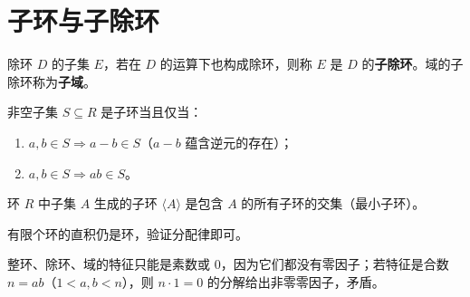 \section{子环与子除环}

\begin{definition}[子除环]
除环 $D$ 的子集 $E$，若在 $D$ 的运算下也构成除环，则称 $E$ 是 $D$ 的\textbf{子除环}。域的子除环称为\textbf{子域}。
\end{definition}

\begin{lemma}[子环的等价条件（引理 2.1）]
非空子集 $S \subseteq R$ 是子环当且仅当：
\begin{enumerate}
  \item $a, b \in S \Rightarrow a - b \in S$（$a-b$ 蕴含逆元的存在）；
  \item $a, b \in S \Rightarrow ab \in S$。
\end{enumerate}
\end{lemma}

\begin{definition}[子集生成的环（定义 2.7）]
环 $R$ 中子集 $A$ 生成的子环 $\langle A \rangle$ 是包含 $A$ 的所有子环的交集（最小子环）。
\end{definition}

\begin{theorem}[定理 2：环的直积还是环（命题 2.5）]
有限个环的直积仍是环，验证分配律即可。
\end{theorem}

\begin{proposition}[整环中素数阶]
整环、除环、域的特征只能是素数或 $0$，因为它们都没有零因子；若特征是合数 $n = ab$（$1 < a, b < n$），则 $n \cdot 1 = 0$ 的分解给出非零零因子，矛盾。
\end{proposition}

